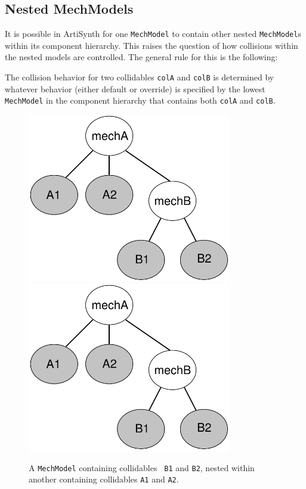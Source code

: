 \subsection{Nested MechModels}

It is possible in ArtiSynth for one {\tt MechModel} to contain other
nested {\tt MechModel}s within its component hierarchy. This raises
the question of how collisions within the nested models are
controlled. The general rule for this is the following:

\begin{sideblock}
The collision behavior for two collidables {\tt colA} and {\tt colB}
is determined by whatever behavior (either default or override) is
specified by the lowest {\tt MechModel} in the component hierarchy
that contains both {\tt colA} and {\tt colB}.
\end{sideblock}

\begin{figure}[ht]
\begin{center}
 \iflatexml
   \includegraphics[width=3.5in]{images/NestedMechCollidables}
 \else
   \includegraphics[width=3.5in]{images/NestedMechCollidables}
 \fi
\end{center}
\caption{A {\tt MechModel} containing collidables {\tt
B1} and {\tt B2}, nested within another
containing collidables {\tt A1} and {\tt A2}.}
\label{NestedMechCollidables:fig}
\end{figure}

